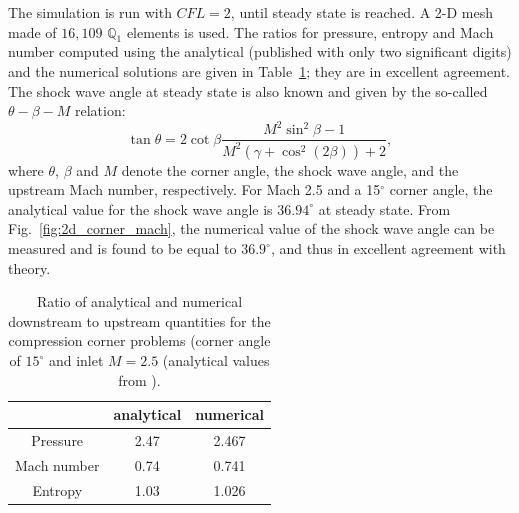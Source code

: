 \documentclass[preprint,10pt]{elsarticle}
\newcommand{\fig}[1]{Fig.~\ref{#1}}                      %
\newcommand{\tbl}[1]{Table~\ref{#1}}                     %
\begin{document}
The simulation is run with $CFL=2$, until steady state is reached. A 2-D mesh made of $16,109$ $\mathbb{Q}_1$ elements is used. The ratios for pressure, entropy and Mach number computed using the analytical (published with only two significant digits) and the numerical solutions are given in \tbl{tbl:corner_exact_sol}; they are in excellent agreement. The shock wave angle at steady state is also known and given by the so-called $\theta -\beta -M$ relation:
%
\begin{equation}
\tan \theta = 2 \cot \beta \frac{M^2 \sin^2 \beta -1}{M^2 \left(\gamma+\cos^2 (2\beta)\right)+2} ,
\end{equation}
%
where $\theta$, $\beta$ and $M$ denote the corner angle, the shock wave angle, and the upstream Mach number, respectively. For Mach 2.5 and a 15$^\circ$ corner angle, the analytical value for the shock wave angle is $36.94^{\circ}$ at steady state. From \fig{fig:2d_corner_mach}, the numerical value of the shock wave angle can be measured and is found to be equal to $36.9^{\circ}$, and thus in excellent agreement with theory.
%
\begin{table}[H]
\begin{center}
\begin{tabular}{|c|c|c|}  \hline
            & analytical & numerical\\ \hline
Pressure    & 2.47       & 2.467    \\ \hline
Mach number &  0.74      & 0.741    \\ \hline
Entropy     & 1.03       & 1.026    \\ \hline 
\end{tabular}
\caption{\label{tbl:corner_exact_sol} Ratio of analytical and numerical downstream to upstream quantities for the compression corner problems (corner angle of $15^\circ$ and inlet $M=2.5$ (analytical values from \cite{CompressionCorner}).}
\end{center}
\end{table}
%
\end{document}
